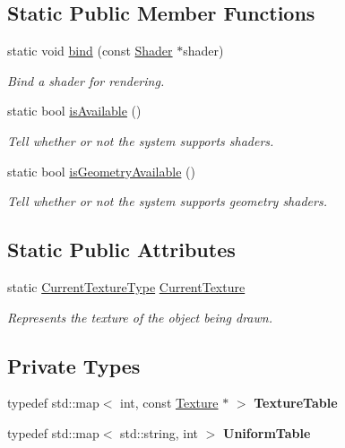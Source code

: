\subsection*{Static Public Member Functions}
\begin{DoxyCompactItemize}
\item 
static void \mbox{\hyperlink{classsf_1_1_shader_a09778f78afcbeb854d608c8dacd8ea30}{bind}} (const \mbox{\hyperlink{classsf_1_1_shader}{Shader}} $\ast$shader)
\begin{DoxyCompactList}\small\item\em Bind a shader for rendering. \end{DoxyCompactList}\item 
static bool \mbox{\hyperlink{classsf_1_1_shader_ad22474690bafe4a305c1b9826b1bd86a}{is\+Available}} ()
\begin{DoxyCompactList}\small\item\em Tell whether or not the system supports shaders. \end{DoxyCompactList}\item 
static bool \mbox{\hyperlink{classsf_1_1_shader_a45db14baf1bbc688577f81813b1fce96}{is\+Geometry\+Available}} ()
\begin{DoxyCompactList}\small\item\em Tell whether or not the system supports geometry shaders. \end{DoxyCompactList}\end{DoxyCompactItemize}
\subsection*{Static Public Attributes}
\begin{DoxyCompactItemize}
\item 
static \mbox{\hyperlink{structsf_1_1_shader_1_1_current_texture_type}{Current\+Texture\+Type}} \mbox{\hyperlink{classsf_1_1_shader_ac84c7953eec2e19358ea6e2cc5385b8d}{Current\+Texture}}
\begin{DoxyCompactList}\small\item\em Represents the texture of the object being drawn. \end{DoxyCompactList}\end{DoxyCompactItemize}
\subsection*{Private Types}
\begin{DoxyCompactItemize}
\item 
\mbox{\label{classsf_1_1_shader_a9a60c773571550fd54a394d4ce83f4a3}} 
typedef std\+::map$<$ int, const \mbox{\hyperlink{classsf_1_1_texture}{Texture}} $\ast$ $>$ {\bfseries Texture\+Table}
\item 
\mbox{\label{classsf_1_1_shader_a010c8213c1f81acd3b285566f6c8fced}} 
typedef std\+::map$<$ std\+::string, int $>$ {\bfseries Uniform\+Table}
\end{DoxyCompactItemize}
